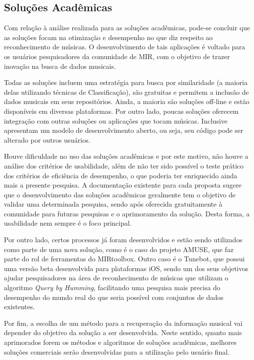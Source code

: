 \subsection{Soluções Acadêmicas}

Com relação à análise realizada para as soluções acadêmicas, pode-se concluir que as soluções focam na otimização e desempenho no que diz respeito ao reconhecimento de músicas. O desenvolvimento de tais aplicações é voltado para os usuários pesquisadores da comunidade de MIR, com o objetivo de trazer inovação na busca de dados musicais.

Todas as soluções incluem uma estratégia para busca por similaridade (a maioria delas utilizando técnicas de Classificação), são gratuitas e permitem a inclusão de dados musicais em seus repositórios. Ainda, a maioria são soluções off-line e estão disponíveis em diversas plataformas. Por outro lado, poucas soluções oferecem integração com outras soluções ou aplicações que tocam músicas. Inclusive apresentam um modelo de desenvolvimento aberto, ou seja, seu código pode ser alterado por outros usuários.

Houve dificuldade no uso das soluções acadêmicas e por este motivo, não houve a análise dos critérios de usabilidade, além de não ter sido possível o teste prático dos critérios de eficiência de desempenho, o que poderia ter enriquecido ainda mais a presente pesquisa. A documentação existente para cada proposta sugere que o desenvolvimento das soluções acadêmicas geralmente tem o objetivo de validar uma determinada pesquisa, sendo após oferecida gratuitamente à comunidade para futuras pesquisas e o aprimoramento da solução. Desta forma, a usabilidade nem sempre é o foco principal. 

Por outro lado, certos processos já foram desenvolvidos e estão sendo utilizados como parte de uma nova solução, como é o caso do projeto AMUSE, que faz parte do rol de ferramentas do MIRtoolbox. Outro caso é o Tunebot, que possui uma versão beta desenvolvida para plataformas iOS, sendo um dos seus objetivos ajudar pesquisadores na área de reconhecimento de músicas que utilizam o algoritmo \textit{Query by Humming}, facilitando uma pesquisa mais precisa do desempenho do mundo real do que seria possível com conjuntos de dados existentes.

Por fim, a escolha de um método para a recuperação da informação musical vai depender do objetivo da solução a ser desenvolvida. Neste sentido, quanto mais aprimorados forem os métodos e algoritmos de soluções acadêmicas, melhores soluções comerciais serão desenvolvidas para a utilização pelo usuário final.
